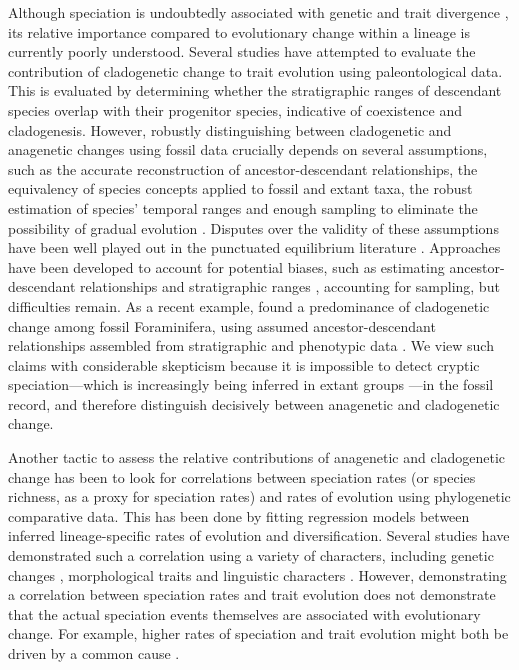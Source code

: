 Although speciation is undoubtedly associated with genetic and trait divergence \citep[][and references therein]{Nosil2012}, its relative importance compared to evolutionary change within a lineage is currently poorly understood. Several studies have attempted to evaluate the contribution of cladogenetic change to trait evolution \citep{WagnerErwin1995, JC1999, Aze2011, Strotz2013} using paleontological data. This is evaluated by determining whether the stratigraphic ranges of descendant species overlap with their progenitor species, indicative of coexistence and cladogenesis. However, robustly distinguishing between cladogenetic and anagenetic changes using fossil data crucially depends on several assumptions, such as the accurate reconstruction of ancestor-descendant relationships, the equivalency of species concepts applied to fossil and extant taxa, the robust estimation of species' temporal ranges and enough sampling to eliminate the possibility of gradual evolution \citep{JC1999}. Disputes over the validity of these assumptions have been well played out in the punctuated equilibrium literature \citep[e.g., the Turkana Basin molluscs,][]{Williamson1981, Fryer1983, VanBocxlaer2008}. Approaches have been developed to account for potential biases, such as estimating ancestor-descendant relationships \citep{Marshall1995, Foote1996} and stratigraphic ranges \citep{Marshall1990, Marshall1994, Marshall1997, Wagner2000}, accounting for sampling, but difficulties remain.  As a recent example, \citet{Strotz2013} found a predominance of cladogenetic change among fossil Foraminifera, using assumed ancestor-descendant relationships assembled from stratigraphic and phenotypic data \citep{Aze2011}. We view such claims with considerable skepticism because it is impossible to detect cryptic speciation---which is increasingly being inferred in extant groups \citep{Fujita2012}---in the fossil record, and therefore distinguish decisively between anagenetic and cladogenetic change.

Another tactic to assess the relative contributions of anagenetic and cladogenetic change has been to look for correlations between speciation rates (or species richness, as a proxy for speciation rates) and rates of evolution using phylogenetic comparative data. This has been done by fitting regression models between inferred lineage-specific rates of evolution and diversification. Several studies have demonstrated such a correlation using a variety of characters, including genetic changes \citep{Webster2003, Pagel2006, VendittiPagel2010}, morphological traits \citep{Ricklefs2004, Adams2009, RaboskyAdams2012, Rabosky2013} and linguistic characters \citep{Atkinson2008}. However, demonstrating a correlation between speciation rates and trait evolution does not demonstrate that the actual speciation events themselves are associated with evolutionary change. For example, higher rates of speciation and trait evolution might both be driven by a common cause \citep[][see below, \textsc{box 2}]{Rabosky2012}.

